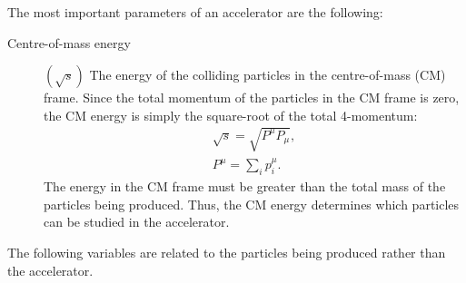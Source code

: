 The most important parameters of an accelerator are the following:
\begin{description}

	\item[Centre-of-mass energy]  $(\sqrt{s})$ The energy of the colliding particles in the centre-of-mass (CM) frame. Since the total momentum of the particles in the CM frame is zero, the CM energy is simply the square-root of the total 4-momentum:
	$$
	\begin{gathered}
		\sqrt{s}=\sqrt{P^{\mu} P_{\mu}}, \\
		P^{\mu}=\sum_{i} p_{i}^{\mu}.
	\end{gathered}
	$$
	The energy in the CM frame must be greater than the total mass of the particles being produced. Thus, the CM energy determines which particles can be studied in the accelerator.
\end{description}
\begin{center}
  
  \label{fig_cms_coor}
\end{center}
The following variables are related to the particles being produced rather than the accelerator.
